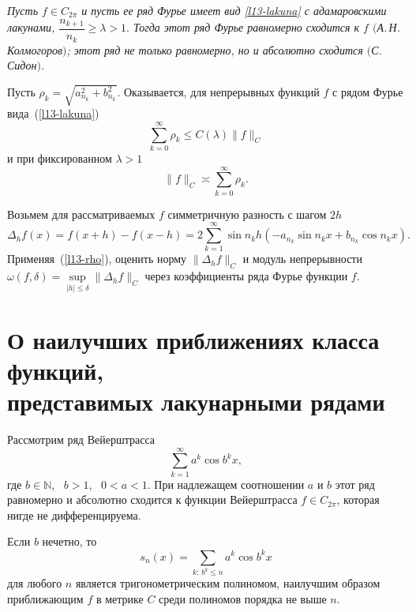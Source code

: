 \textit{Пусть {$f\in C_{2\pi}$} и пусть ее ряд Фурье имеет вид
\eqref{l13-lakuna} с адамаровскими лакунами, $\dfrac{n_{k+1}}{n_k}\ge
\lambda>1.$ Тогда этот ряд Фурье равномерно сходится к $f$ {$($А.\,Н.\,Колмогоров$)$;}
этот ряд не только равномерно, но и абсолютно сходится
{$($С.\,Сидон$)$.}}

Пусть $\rho_k=\sqrt{a_{n_k}^2+b_{n_k}^2}$. Оказывается, для непрерывных
функций $f$ с рядом Фурье вида~(\ref{l13-lakuna})
$$
\sum\limits_{k=0}^{\infty}\rho_k\le C(\lambda)\|f\|_C
$$
и при фиксированном $\lambda>1$
\begin{equation}\label{l13-rho}
\|f\|_C \asymp \sum\limits_{k=0}^{\infty} \rho_k.
\end{equation}

\begin{ex}
Возьмем для рассматриваемых $f$ симметричную разность с шагом $2h$
$$
\Delta_h f(x)=f(x+h)-f(x-h) = 2\sum\limits_{k=1}^{\infty} \sin
{ n_k h(-a_{n_k}\sin n_k x+b_{n_k}\cos n_k x)}.
$$
Применяя~(\ref{l13-rho}), оценить норму $\|\Delta_hf\|_C$ и модуль непрерывности
$\omega(f,\delta)=\sup\limits_{|h|\le \delta} \|\Delta_h f\|_C$
через коэффициенты ряда Фурье функции $f$.
\end{ex}


\section{О наилучших приближениях класса функций,\\
представимых лакунарными рядами}

Рассмотрим ряд Вейерштрасса
$$
\sum\limits_{k=1}^{\infty} a^k\cos b^k x,
$$
где $b\in\mathbb N$,~ $b>1$,~ $0<a<1$. При надлежащем соотношении $a$ и
$b$ этот ряд равномерно и абсолютно сходится к функции Вейерштрасса
$f\in C_{2\pi}$, которая нигде не дифференцируема.

\begin{teo}[С.\,Н.\,Бернштейн]
Если $b$ нечетно, то
$$
s_n(x)=\sum\limits_{k:\,b^k\le n} a^k\cos b^k x
$$
для любого $n$ является тригонометрическим полиномом, наилучшим
образом приближающим $f$ в метрике $C$ среди полиномов порядка не выше
$n$.
\end{teo}

